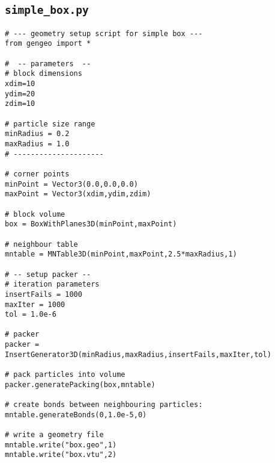 \subsection{\texttt{simple\_box.py}}\label{geocode:box}

\begin{verbatim}
# --- geometry setup script for simple box ---
from gengeo import *

#  -- parameters  --
# block dimensions
xdim=10
ydim=20
zdim=10

# particle size range
minRadius = 0.2
maxRadius = 1.0
# ---------------------

# corner points
minPoint = Vector3(0.0,0.0,0.0)
maxPoint = Vector3(xdim,ydim,zdim)

# block volume
box = BoxWithPlanes3D(minPoint,maxPoint)

# neighbour table 
mntable = MNTable3D(minPoint,maxPoint,2.5*maxRadius,1)

# -- setup packer --
# iteration parameters
insertFails = 1000
maxIter = 1000
tol = 1.0e-6

# packer
packer = InsertGenerator3D(minRadius,maxRadius,insertFails,maxIter,tol)

# pack particles into volume
packer.generatePacking(box,mntable)
	
# create bonds between neighbouring particles:
mntable.generateBonds(0,1.0e-5,0)

# write a geometry file
mntable.write("box.geo",1)
mntable.write("box.vtu",2)
\end{verbatim}